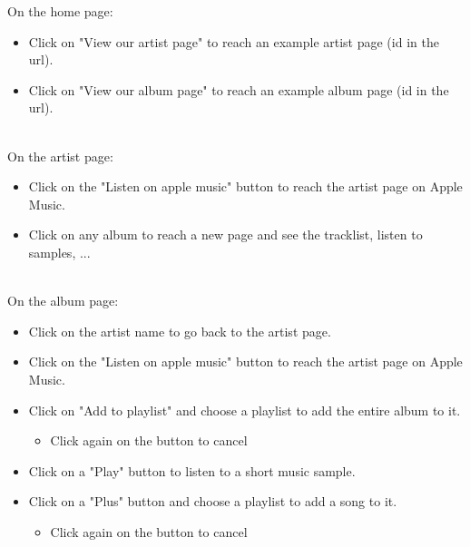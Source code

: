 \documentclass[11pt]{article}
\begin{document}
		\noindent
		On the home page:
		\begin{itemize}
		\item Click on "View our artist page" to reach an example artist page (id in the url).
		\item Click on "View our album page" to reach an example album page (id in the url).
		\end{itemize}

		\noindent \\
		On the artist page:
		\begin{itemize}
        \item Click on the "Listen on apple music" button to reach the artist page on Apple Music.
        \item Click on any album to reach a new page and see the tracklist, listen to samples, ...
        \end{itemize}

        \noindent \\
        On the album page:
        \begin{itemize}
        \item Click on the artist name to go back to the artist page.
        \item Click on the "Listen on apple music" button to reach the artist page on Apple Music.
        \item Click on "Add to playlist" and choose a playlist to add the entire album to it.
            \begin{itemize}
            \item Click again on the button to cancel
            \end{itemize}
        \item Click on a "Play" button to listen to a short music sample.
        \item Click on a "Plus" button and choose a playlist to add a song to it.
            \begin{itemize}
            \item Click again on the button to cancel
            \end{itemize}
        \end{itemize}
        
\end{document}
